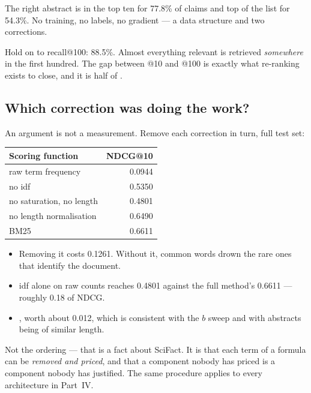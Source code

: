 \documentclass[11pt,a4paper]{article}
\begin{document}
The right abstract is in the top ten for 77.8\% of claims and top of the list
for 54.3\%. No training, no labels, no gradient --- a data structure and two
corrections.

Hold on to recall@100: 88.5\%. Almost everything relevant is retrieved
\emph{somewhere} in the first hundred. The gap between @10 and @100 is exactly
what re-ranking exists to close, and it is half of .

\subsection{Which correction was doing the work?}

An argument is not a measurement. Remove each correction in turn, full test
set:

\begin{center}
\small
\begin{tabular}{lr}
\toprule
\textbf{Scoring function} & \textbf{NDCG@10} \\
\midrule
raw term frequency               & 0.0944 \\
no idf                           & 0.5350 \\
no saturation, no length         & 0.4801 \\
no length normalisation          & 0.6490 \\
BM25                             & 0.6611 \\
\bottomrule
\end{tabular}
\end{center}

\begin{itemize}[leftmargin=*]
  \item {} Removing it costs 0.1261. Without
        it, common words drown the rare ones that identify the document.
  \item {} idf alone on raw counts reaches
        0.4801 against the full method's 0.6611 --- roughly 0.18 of NDCG.
  \item {}, worth about 0.012,
        which is consistent with the $b$ sweep and with abstracts being of
        similar length.
\end{itemize}

\begin{keybox}[title={The transferable part}]
Not the ordering --- that is a fact about SciFact. It is that each term of a
formula can be \emph{removed and priced}, and that a component nobody has
priced is a component nobody has justified. The same procedure applies to every
architecture in Part~IV.
\end{keybox}
\end{document}
